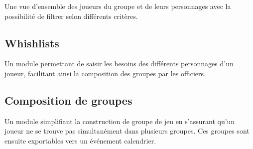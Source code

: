 	Une vue d'ensemble des joueurs du groupe et de leurs personnages avec la possibilité de filtrer selon différents critères.
	
	\subsection{Whishlists}
	
	Un module permettant de saisir les besoins des différents personnages d'un joueur, facilitant ainsi la composition des groupes par les officiers.
	
	\subsection{Composition de groupes}
	
	Un module simplifiant la construction de groupe de jeu en s'assurant qu'un joueur ne se trouve pas simultanément dans plusieurs groupes. Ces groupes sont ensuite exportables vers un événement calendrier.
	